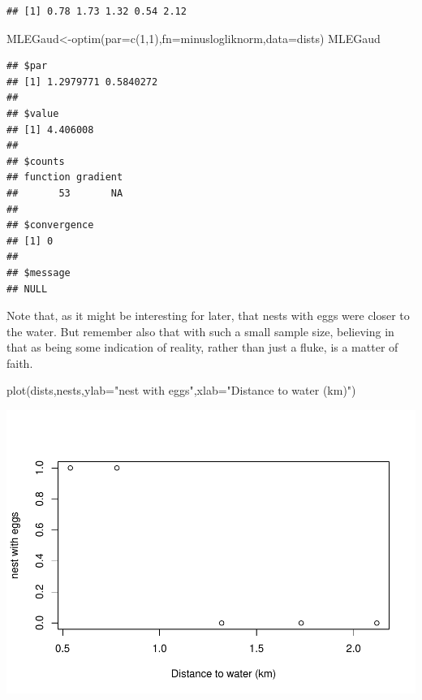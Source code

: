 \documentclass[
]{book}
\newenvironment{Shaded}{\begin{snugshade}}{\end{snugshade}}
\newcommand{\AttributeTok}[1]{\textcolor[rgb]{0.77,0.63,0.00}{#1}}
\newcommand{\DecValTok}[1]{\textcolor[rgb]{0.00,0.00,0.81}{#1}}
\newcommand{\FunctionTok}[1]{\textcolor[rgb]{0.00,0.00,0.00}{#1}}
\newcommand{\NormalTok}[1]{#1}
\newcommand{\OtherTok}[1]{\textcolor[rgb]{0.56,0.35,0.01}{#1}}
\newcommand{\StringTok}[1]{\textcolor[rgb]{0.31,0.60,0.02}{#1}}
\begin{document}
\begin{verbatim}
## [1] 0.78 1.73 1.32 0.54 2.12
\end{verbatim}

\begin{Shaded}
\begin{Highlighting}[]
\NormalTok{MLEGaud}\OtherTok{\textless{}{-}}\FunctionTok{optim}\NormalTok{(}\AttributeTok{par=}\FunctionTok{c}\NormalTok{(}\DecValTok{1}\NormalTok{,}\DecValTok{1}\NormalTok{),}\AttributeTok{fn=}\NormalTok{minuslogliknorm,}\AttributeTok{data=}\NormalTok{dists)}
\NormalTok{MLEGaud}
\end{Highlighting}
\end{Shaded}

\begin{verbatim}
## $par
## [1] 1.2979771 0.5840272
## 
## $value
## [1] 4.406008
## 
## $counts
## function gradient 
##       53       NA 
## 
## $convergence
## [1] 0
## 
## $message
## NULL
\end{verbatim}

Note that, as it might be interesting for later, that nests with eggs were closer to the water. But remember also that with such a small sample size, believing in that as being some indication of reality, rather than just a fluke, is a matter of faith.

\begin{Shaded}
\begin{Highlighting}[]
\FunctionTok{plot}\NormalTok{(dists,nests,}\AttributeTok{ylab=}\StringTok{"nest with eggs"}\NormalTok{,}\AttributeTok{xlab=}\StringTok{"Distance to water (km)"}\NormalTok{)}
\end{Highlighting}
\end{Shaded}

\includegraphics{ECOMODbook_files/figure-latex/ch13.24-1.pdf}
\end{document}
